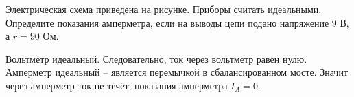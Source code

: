 
Электрическая схема приведена на рисунке. Приборы считать идеальными. Определите показания амперметра, 
если на выводы цепи подано напряжение $ 9 $ В, \linebreak а $ r=90 $ Ом.



\solutionSection

Вольтметр идеальный. Следовательно, ток через вольтметр равен нулю. Амперметр идеальный – 
является перемычкой в сбалансированном мосте. Значит через амперметр ток не течёт, показания амперметра $I_A=0$.

